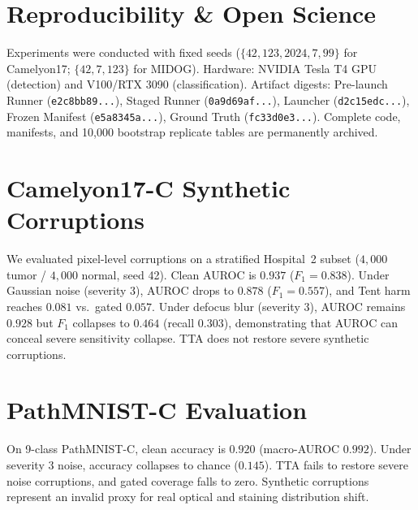 \documentclass[conference]{IEEEtran}
\begin{document}
\section*{Reproducibility \& Open Science}
Experiments were conducted with fixed seeds ($\{42, 123, 2024, 7, 99\}$ for Camelyon17; $\{42, 7, 123\}$ for MIDOG).
Hardware: NVIDIA Tesla T4 GPU (detection) and V100/RTX 3090 (classification).
Artifact digests: Pre-launch Runner (\texttt{e2c8bb89...}), Staged Runner (\texttt{0a9d69af...}), Launcher (\texttt{d2c15edc...}), Frozen Manifest (\texttt{e5a8345a...}), Ground Truth (\texttt{fc33d0e3...}).
Complete code, manifests, and 10,000 bootstrap replicate tables are permanently archived.

\appendix
\section{Camelyon17-C Synthetic Corruptions}
We evaluated pixel-level corruptions on a stratified Hospital~2 subset ($4{,}000$ tumor / $4{,}000$ normal, seed 42).
Clean AUROC is $0.937$ ($F_1 = 0.838$).
Under Gaussian noise (severity 3), AUROC drops to $0.878$ ($F_1 = 0.557$), and Tent harm reaches $0.081$ vs.\ gated $0.057$.
Under defocus blur (severity 3), AUROC remains $0.928$ but $F_1$ collapses to $0.464$ (recall $0.303$), demonstrating that AUROC can conceal severe sensitivity collapse.
TTA does not restore severe synthetic corruptions.

\section{PathMNIST-C Evaluation}
On 9-class PathMNIST-C, clean accuracy is $0.920$ (macro-AUROC $0.992$).
Under severity 3 noise, accuracy collapses to chance ($0.145$).
TTA fails to restore severe noise corruptions, and gated coverage falls to zero.
Synthetic corruptions represent an invalid proxy for real optical and staining distribution shift.
\end{document}
